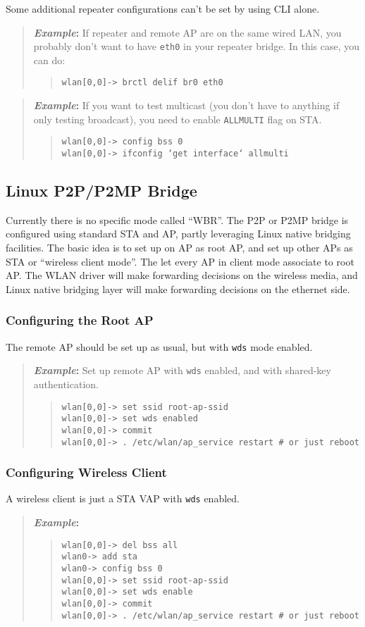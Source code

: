\documentclass[10pt,fullpage]{article}
\newcommand{\mytt}[1]{{\texttt{#1}}}
\newcommand{\bv}{\begin{verse}}
\newcommand{\ev}{\end{verse}}
\newcommand{\cliparam}[1]{{\texttt{#1}}}
\newcommand{\clidemo}[1]{{\texttt{wlan[0,0]-> #1}}}
\newcommand{\clidemonobss}[1]{{\texttt{wlan0-> #1}}}
\newenvironment{example}{\begin{quote}\textbf{\textit{Example}:}}{\end{quote}}
\begin{document}
Some additional repeater configurations can't be set by using CLI alone. 

\begin{example}
If repeater and remote AP are on the same wired LAN,
you probably don't want to have \mytt{eth0} in your repeater bridge.
In this case, you can do:
  \bv
  \clidemo{brctl delif br0 eth0}
  \ev
\end{example}

\begin{example}
If you want to test multicast (you don't have to anything if only
testing broadcast), you need to enable \mytt{ALLMULTI} flag on STA.
  \bv
  \clidemo{config bss 0}\\
  \clidemo{ifconfig `get interface` allmulti}
  \ev
\end{example}

\subsection{Linux P2P/P2MP Bridge}
Currently there is no specific mode called ``WBR''. The P2P or P2MP bridge
is configured using standard STA and AP, partly leveraging Linux native
bridging facilities. The basic idea is to set up on AP as root
AP, and set up other APs as STA or ``wireless client mode''. The let every
AP in client mode associate to root AP. The WLAN driver will make forwarding
decisions on the wireless media, and Linux native bridging layer will
make forwarding decisions on the ethernet side.

\subsubsection{Configuring the Root AP}
The remote AP should be set up as usual, but with \cliparam{wds} mode
enabled.
\begin{example}
  Set up remote AP with \cliparam{wds} enabled, and with shared-key
authentication.
  \bv
  \clidemo{set ssid root-ap-ssid}\\
  \clidemo{set wds enabled}\\
  \clidemo{commit}\\
  \clidemo{.  /etc/wlan/ap\_service restart        \# or just reboot}
  \ev
\end{example}

\subsubsection{Configuring Wireless Client}
A wireless client is just a STA VAP with \cliparam{wds} enabled.
\begin{example}
  \bv
  \clidemo{del bss all}\\
  \clidemonobss{add sta}\\
  \clidemonobss{config bss 0}\\
  \clidemo{set ssid root-ap-ssid}\\
  \clidemo{set wds enable}\\
  \clidemo{commit}\\
  \clidemo{.  /etc/wlan/ap\_service restart        \# or just reboot}
  \ev
\end{example}
\end{document}
